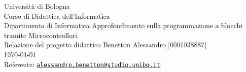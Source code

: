 \documentclass[../../relazione.tex]{subfiles}
\begin{document}
\begin{titlepage}
    \begin{center}
    {
        \LARGE{
            Università di Bologna \\ [1ex]
            Corso di Didattica dell'Informatica \\ Dipartimento di Informatica
        }
        \vfill
        {\huge
            Approfondimento sulla programmazione a blocchi tramite Microcontrollori.
        }
        \\ [1ex]
        {\large 
            Relazione del progetto didattico
        }
        \vfill
        {\large   
            Benetton Alessandro [0001038887]\\[0.75ex]
            
        \vfill
        \today
        \\[4ex]
        Referente: \href{mailto:alessandro.benetton@studio.unibo.it}{\tt alessandro.benetton@studio.unibo.it}
        }
    }
    \end{center}
\end{titlepage}
\end{document}

